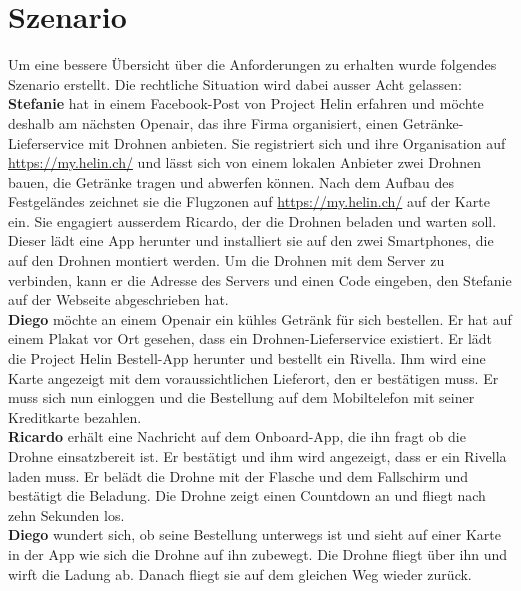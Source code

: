


\newpage


\section{Szenario}

Um eine bessere Übersicht über die Anforderungen zu erhalten wurde folgendes Szenario erstellt. Die rechtliche Situation wird dabei ausser Acht gelassen:\\

\textbf{Stefanie} hat in einem Facebook-Post von Project Helin erfahren und möchte deshalb am nächsten Openair, das ihre Firma organisiert, einen Getränke-Lieferservice mit Drohnen anbieten. Sie registriert sich und ihre Organisation auf \url{https://my.helin.ch/} und lässt sich von einem lokalen Anbieter zwei Drohnen bauen, die Getränke tragen und abwerfen können. Nach dem Aufbau des Festgeländes zeichnet sie die Flugzonen auf \url{https://my.helin.ch/} auf der Karte ein. Sie engagiert ausserdem Ricardo, der die Drohnen beladen und warten soll. Dieser lädt eine App herunter und installiert sie auf den zwei Smartphones, die auf den Drohnen montiert werden. Um die Drohnen mit dem Server zu verbinden, kann er die Adresse des Servers und einen Code eingeben, den Stefanie auf der Webseite abgeschrieben hat.\\

\textbf{Diego} möchte an einem Openair ein kühles Getränk für sich bestellen. Er hat auf einem Plakat vor Ort gesehen, dass ein Drohnen-Lieferservice existiert. Er lädt die Project Helin Bestell-App herunter und bestellt ein Rivella. Ihm wird eine Karte angezeigt mit dem voraussichtlichen Lieferort, den er bestätigen muss. Er muss sich nun einloggen und die Bestellung auf dem Mobiltelefon mit seiner Kreditkarte bezahlen.\\

\textbf{Ricardo} erhält eine Nachricht auf dem Onboard-App, die ihn fragt ob die Drohne einsatzbereit ist. Er bestätigt und ihm wird angezeigt, dass er ein Rivella laden muss. Er belädt die Drohne mit der Flasche und dem Fallschirm und bestätigt die Beladung. Die Drohne zeigt einen Countdown an und fliegt nach zehn Sekunden los. \\

\textbf{Diego} wundert sich, ob seine Bestellung unterwegs ist und sieht auf einer Karte in der App wie sich die Drohne auf ihn zubewegt. Die Drohne fliegt über ihn und wirft die Ladung ab. Danach fliegt sie auf dem gleichen Weg wieder zurück.\\

